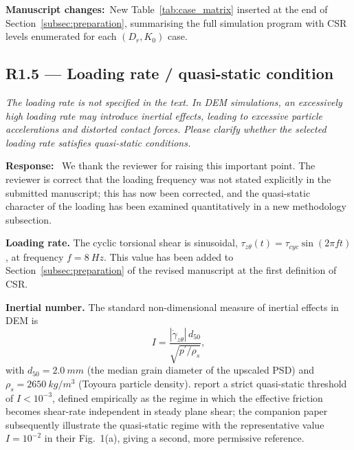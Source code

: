 \documentclass[11pt,a4paper]{article}
\newenvironment{rcomment}
  {\begin{leftbar}\color{black!75}\itshape}
  {\end{leftbar}\vspace{0.3em}}
\newcommand{\response}{\par\noindent\textbf{Response:}\ \ignorespaces}
\newcommand{\changed}[1]{\par\noindent\textbf{Manuscript changes:}\ #1\par}
\newcommand{\Kzero}{\ensuremath{K_0}}
\begin{document}
\changed{New Table~\ref{tab:case_matrix} inserted at the end of
Section~\ref{subsec:preparation}, summarising the full simulation
program with CSR levels enumerated for each $(D_r, \Kzero)$ case.}

\subsection*{R1.5 --- Loading rate / quasi-static condition}

\begin{rcomment}
The loading rate is not specified in the text. In DEM simulations, an
excessively high loading rate may introduce inertial effects, leading to
excessive particle accelerations and distorted contact forces. Please
clarify whether the selected loading rate satisfies quasi-static conditions.
\end{rcomment}

\response
We thank the reviewer for raising this important point. The reviewer
is correct that the loading frequency was not stated explicitly in the
submitted manuscript; this has now been corrected, and the
quasi-static character of the loading has been examined quantitatively
in a new methodology subsection.

\medskip
\noindent\textbf{Loading rate.}
The cyclic torsional shear is sinusoidal,
$\tau_{z\theta}(t) = \tau_{cyc}\sin(2\pi f t)$, at frequency
$f=\SI{8}{Hz}$. This value has been added to
Section~\ref{subsec:preparation} of the revised manuscript at the
first definition of CSR.

\medskip
\noindent\textbf{Inertial number.}
The standard non-dimensional measure of inertial effects in DEM
\citep{GDRMiDi2004,daCruzEmam2005} is
\begin{equation}
I = \frac{|\dot\gamma_{z\theta}|\,d_{50}}{\sqrt{p^\prime/\rho_s}},
\label{eq:inertial_number_letter}
\end{equation}
with $d_{50}=\SI{2.0}{mm}$ (the median grain diameter of the upscaled
PSD) and $\rho_s=\SI{2650}{kg/m^3}$ (Toyoura particle density).
\citet{GDRMiDi2004} report a strict quasi-static threshold of
$I<10^{-3}$, defined empirically as the regime in which the effective
friction becomes shear-rate independent in steady plane shear; the
companion paper \citet{daCruzEmam2005} subsequently illustrate the
quasi-static regime with the representative value $I=10^{-2}$ in their
Fig.~1(a), giving a second, more permissive reference.
\end{document}
